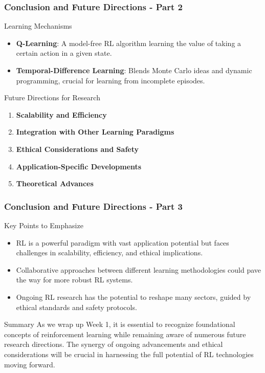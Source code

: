 \documentclass[aspectratio=169]{beamer}
\begin{document}
\begin{frame}[fragile]
    \frametitle{Conclusion and Future Directions - Part 2}

    \begin{block}{Learning Mechanisms}
        \begin{itemize}
            \item \textbf{Q-Learning}: A model-free RL algorithm learning the value of taking a certain action in a given state.
            \item \textbf{Temporal-Difference Learning}: Blends Monte Carlo ideas and dynamic programming, crucial for learning from incomplete episodes.
        \end{itemize}
    \end{block}

    \begin{block}{Future Directions for Research}
        \begin{enumerate}
            \item \textbf{Scalability and Efficiency}
            \item \textbf{Integration with Other Learning Paradigms}
            \item \textbf{Ethical Considerations and Safety}
            \item \textbf{Application-Specific Developments}
            \item \textbf{Theoretical Advances}
        \end{enumerate}
    \end{block}
\end{frame}

\begin{frame}[fragile]
    \frametitle{Conclusion and Future Directions - Part 3}
    
    \begin{block}{Key Points to Emphasize}
        \begin{itemize}
            \item RL is a powerful paradigm with vast application potential but faces challenges in scalability, efficiency, and ethical implications.
            \item Collaborative approaches between different learning methodologies could pave the way for more robust RL systems.
            \item Ongoing RL research has the potential to reshape many sectors, guided by ethical standards and safety protocols.
        \end{itemize}
    \end{block}

    \begin{block}{Summary}
        As we wrap up Week 1, it is essential to recognize foundational concepts of reinforcement learning while remaining aware of numerous future research directions. The synergy of ongoing advancements and ethical considerations will be crucial in harnessing the full potential of RL technologies moving forward.
    \end{block}
\end{frame}
\end{document}
